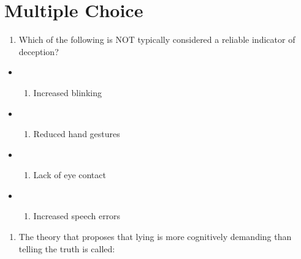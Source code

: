 \documentclass[
  letterpaper,
  DIV=11,
  numbers=noendperiod]{scrreprt}
\providecommand{\tightlist}{%
  \setlength{\itemsep}{0pt}\setlength{\parskip}{0pt}}\usepackage{longtable,booktabs,array}
\begin{document}
\section{Multiple Choice}\label{multiple-choice}

\begin{enumerate}
\def\labelenumi{\arabic{enumi}.}
\tightlist
\item
  Which of the following is NOT typically considered a reliable
  indicator of deception?
\end{enumerate}

\begin{itemize}
\tightlist
\item
  \begin{enumerate}
  \def\labelenumi{(\Alph{enumi})}
  \tightlist
  \item
    Increased blinking\\
  \end{enumerate}
\item
  \begin{enumerate}
  \def\labelenumi{(\Alph{enumi})}
  \setcounter{enumi}{1}
  \tightlist
  \item
    Reduced hand gestures\\
  \end{enumerate}
\item
  \begin{enumerate}
  \def\labelenumi{(\Alph{enumi})}
  \setcounter{enumi}{2}
  \tightlist
  \item
    Lack of eye contact\\
  \end{enumerate}
\item
  \begin{enumerate}
  \def\labelenumi{(\Alph{enumi})}
  \setcounter{enumi}{3}
  \tightlist
  \item
    Increased speech errors
  \end{enumerate}
\end{itemize}

\begin{enumerate}
\def\labelenumi{\arabic{enumi}.}
\setcounter{enumi}{1}
\tightlist
\item
  The theory that proposes that lying is more cognitively demanding than
  telling the truth is called:
\end{enumerate}
\end{document}
